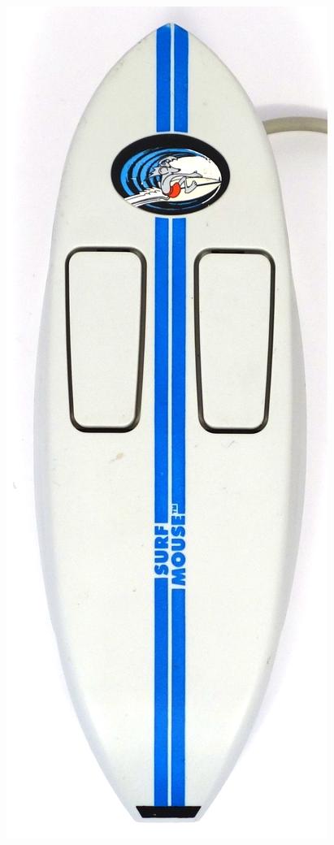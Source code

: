 \documentclass[11pt, a4paper]{article}
\begin{document}
\begin{figure}[h]
    \centering
    \includegraphics[scale=0.46]{2000_surf_mouse/top_60.jpg}

\end{figure}
\end{document}
